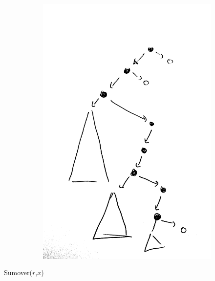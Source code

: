 \begin{figure}[h]
\begin{subfigure}[t]{0.49\textwidth}
  \end{subfigure} \hfill
\begin{subfigure}[t]{0.49\textwidth}
  \includegraphics[scale=0.08]{oavl-q.png}\\
   \end{subfigure} \hfill
\end{figure}
\begin{figure}[h]
\end{figure}



\begin{algbox}{Sumover($r$,$x$)}
  \begin{algorithm}[H]
  \end{algorithm}
\end{algbox}

